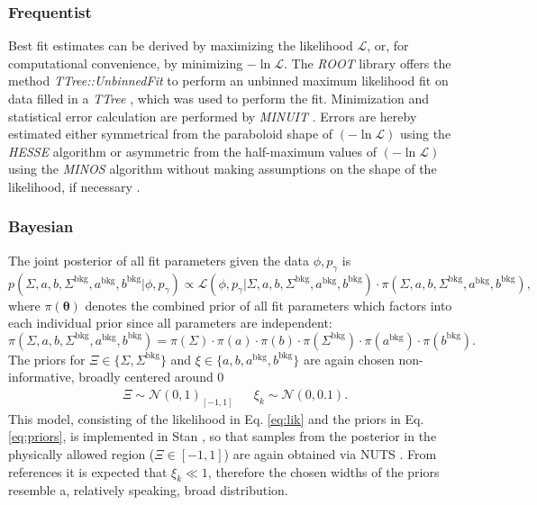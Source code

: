 \subsubsection{Frequentist}
Best fit estimates can be derived by maximizing the likelihood $\mathcal{L}$, or, for computational convenience, by minimizing $-\ln\mathcal{L}$. The \emph{ROOT} library \cite{root} offers the method \emph{TTree::UnbinnedFit} to perform an unbinned maximum likelihood fit on data filled in a \emph{TTree} \cite{runbinnedFit}, which was used to perform the fit. Minimization and statistical error calculation are performed by \emph{MINUIT} \cite{minuit}. Errors are hereby estimated either symmetrical from the paraboloid shape of $(-\ln\mathcal{L})$ using the \emph{HESSE} algorithm or asymmetric from the half-maximum values of $(-\ln\mathcal{L})$ using the \emph{MINOS} algorithm without making assumptions on the shape of the likelihood, if necessary \cite{minuit}.  
\subsubsection{Bayesian}
The joint posterior of all fit parameters given the data $\phi,p_\gamma$ is 
\begin{equation}
	p\left(\Sigma,a,b,\Sigma^\text{bkg},a^\text{bkg},b^\text{bkg}\big|\phi,p_\gamma\right)\propto \mathcal{L}\left(\phi,p_\gamma\big|\Sigma,a,b,\Sigma^\text{bkg},a^\text{bkg},b^\text{bkg}\right)\cdot\pi\left(\Sigma,a,b,\Sigma^\text{bkg},a^\text{bkg},b^\text{bkg}\right),
\end{equation}
where $\pi(\boldsymbol{\theta})$ denotes the combined prior of all fit parameters which factors into each individual prior since all parameters are independent:
\begin{equation}
	\pi\left(\Sigma,a,b,\Sigma^\text{bkg},a^\text{bkg},b^\text{bkg}\right)=\pi\left(\Sigma\right)\cdot\pi\left(a\right)\cdot\pi\left(b\right)\cdot\pi\left(\Sigma^\text{bkg}\right)\cdot\pi\left(a^\text{bkg}\right)\cdot\pi\left(b^\text{bkg}\right).
\end{equation}
The priors for $\Xi\in\{\Sigma,\Sigma^\text{bkg}\}$ and $\xi\in\{a,b,a^\text{bkg},b^\text{bkg}\}$ are again chosen non-informative, broadly centered around 0
\begin{align}
	\Xi\sim\mathcal{N}(0,1)_{[-1,1]} &&\xi_k\sim\mathcal{N}(0,0.1).
	\label{eq:priors}
\end{align}
This model, consisting of the likelihood in Eq. \eqref{eq:lik} and the priors in Eq. \eqref{eq:priors}, is implemented in Stan \cite{stan}, so that samples from the posterior in the physically allowed region ($\Xi\in[-1,1]$) are again obtained via NUTS \cite{nuts}. From references \cite{farahphd,hartmannphd} it  is expected that $\xi_k\ll1$, therefore the chosen widths of the priors resemble a, relatively speaking, broad distribution.


